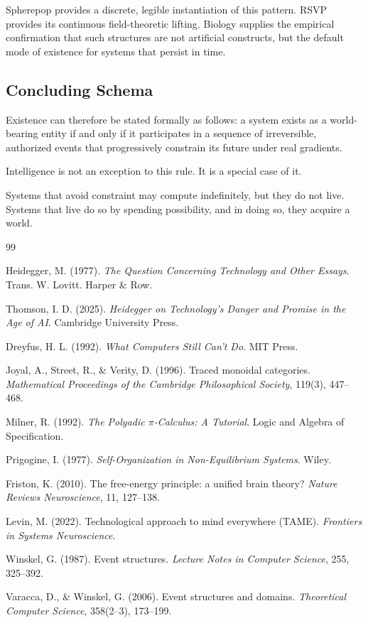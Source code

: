 \documentclass[11pt]{article}
\begin{document}
Spherepop provides a discrete, legible instantiation of this pattern. RSVP provides its continuous field-theoretic lifting. Biology supplies the empirical confirmation that such structures are not artificial constructs, but the default mode of existence for systems that persist in time.

\subsection{Concluding Schema}

Existence can therefore be stated formally as follows: a system exists as a world-bearing entity if and only if it participates in a sequence of irreversible, authorized events that progressively constrain its future under real gradients.

Intelligence is not an exception to this rule. It is a special case of it.

Systems that avoid constraint may compute indefinitely, but they do not live. Systems that live do so by spending possibility, and in doing so, they acquire a world.

\newpage
\begin{thebibliography}{99}

Heidegger, M. (1977).
\textit{The Question Concerning Technology and Other Essays}.
Trans. W. Lovitt.
Harper \& Row.

Thomson, I. D. (2025).
\textit{Heidegger on Technology’s Danger and Promise in the Age of AI}.
Cambridge University Press.

Dreyfus, H. L. (1992).
\textit{What Computers Still Can’t Do}.
MIT Press.

Joyal, A., Street, R., \& Verity, D. (1996).
Traced monoidal categories.
\textit{Mathematical Proceedings of the Cambridge Philosophical Society}, 119(3), 447–468.

Milner, R. (1992).
\textit{The Polyadic $\pi$-Calculus: A Tutorial}.
Logic and Algebra of Specification.

Prigogine, I. (1977).
\textit{Self-Organization in Non-Equilibrium Systems}.
Wiley.

Friston, K. (2010).
The free-energy principle: a unified brain theory?
\textit{Nature Reviews Neuroscience}, 11, 127–138.

Levin, M. (2022).
Technological approach to mind everywhere (TAME).
\textit{Frontiers in Systems Neuroscience}.

Winskel, G. (1987).
Event structures.
\textit{Lecture Notes in Computer Science}, 255, 325–392.

Varacca, D., \& Winskel, G. (2006).
Event structures and domains.
\textit{Theoretical Computer Science}, 358(2–3), 173–199.

\end{thebibliography}
\end{document}
